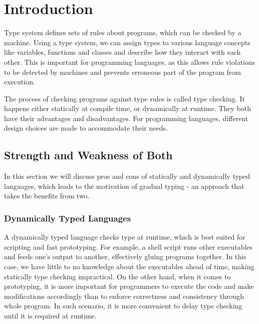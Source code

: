 
\renewcommand{\thechapter}{1}

\chapter{Introduction}

Type system defines sets of rules about programs, which can be checked by a machine.
Using a type system, we can assign types to various language concepts like variables, functions and classes and describe how they interact with each other.
This is important for programming languages, as this allows rule violations
to be detected by machines and prevents erroneous part of the program from execution.

The process of checking programs against type rules is called type checking.
It happens either statically at compile time, or dynamically at runtime.
They both have their advantages and disadvantages.
For programming languages, different design choices are made to
accommodate their needs.

\section{Strength and Weakness of Both}

In this section we will discuss pros and cons of
statically and dynamically typed languages,
which leads to the motivation of gradual typing - an approach that takes the benefits from two.

\subsection{Dynamically Typed Languages}

A dynamically typed language checks type at runtime, which is best suited for scripting and fast prototyping.
For example, a shell script runs other executables and feeds one's output to another, effectively gluing programs together.
In this case, we have little to no knowledge about the executables ahead of time, making statically type checking impractical.
On the other hand, when it comes to prototyping, it is more important for programmers to execute the code and make modifications accordingly
than to enforce correctness and consistency through whole program.
In such scenario, it is more convenient to delay type checking until
it is required at runtime.



